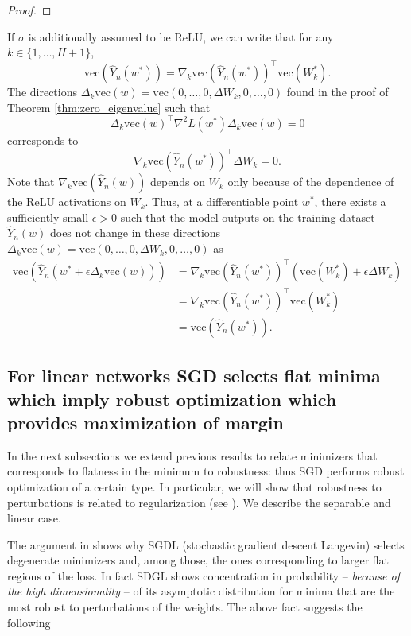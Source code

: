 \documentclass[10pt]{article}
\newcommand{\vect}{\mathrm{vec}}
\begin{document}
\begin{proof}
\end{proof}

If $\sigma$ is additionally assumed to be ReLU, we can write that for any $k \in \{1,\dots,H+1\}$,
$$
\vect(\hat Y_n(w^{*}))=\nabla_k \vect(\hat Y_n(w^{*}))^{\top} \vect(W^{*}_k).
$$
The  directions  $\Delta_k \vect(w)=\vect(0,\dots,0,\Delta W_k,0,\dots,0)$  found in the  proof of Theorem \ref{thm:zero_eigenvalue} such that 
$$
\Delta_k \vect(w)^{\top} \nabla^2 L(w^{*}) \Delta_k \vect(w)=0
$$
corresponds to 
$$
\nabla_k \vect(\hat Y_n(w^{*}))^{\top} \Delta W_k =0.
$$
Note that $\nabla_k \vect(\hat Y_n(w))$ depends on $W_k$ only because of the dependence of the ReLU activations   on $W_k$. Thus, at a differentiable point $w^*$, there exists  a sufficiently small $\epsilon>0$ such that    
the model outputs on the training dataset $\hat Y_n(w)$ does not change in these directions   $\Delta_k \vect(w)=\vect(0,\dots,0,\Delta W_k,0,\dots,0)$ as 
\begin{align*}
\vect(\hat Y_n(w^{*}+ \epsilon\Delta_k \vect(w))) &=\nabla_k \vect(\hat Y_n(w^{*}))^{\top} (\vect(W^{*}_k)+ \epsilon\Delta W_k)
\\ & =\nabla_k \vect(\hat Y_n(w^{*})) ^{\top}\vect(W^{*}_k)
\\ &=\vect(\hat Y_n(w^{*})).
\end{align*}


\subsection{For linear networks SGD selects flat minima which  imply  robust
  optimization which provides maximization of margin}
\label{SGDLFlatRobust}



In the next subsections we extend previous results \cite{BEN:09} to
relate minimizers that corresponds to flatness in the minimum  to  robustness:
thus SGD performs  robust optimization of a certain type. In particular, we
will show that robustness to perturbations 
is related to regularization (see \cite{BEN:09,Xu2009}). We 
describe the separable and linear case.


The argument in \cite{Theory_IIb} shows why SGDL (stochastic gradient
descent Langevin) selects degenerate minimizers and, among those, the ones
corresponding to larger flat regions of the loss. In fact SDGL shows
concentration in probability -- {\it because of the
  high dimensionality} -- of its asymptotic distribution for minima that are the most robust to perturbations
of the weights.  The above fact suggests the following
\end{document}

